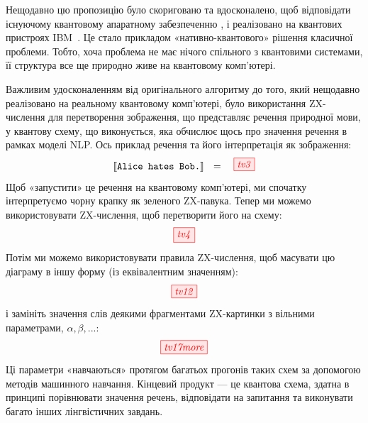 \documentclass[11pt]{article}
\theoremstyle{definition}
\begin{document}
{%



Нещодавно цю пропозицію було скориговано та вдосконалено, щоб відповідати існуючому квантовому апаратному забезпеченню \cite{QPL-QNLP, QNLP-foundations}, і реалізовано на квантових пристроях IBM~\cite{Nature}. Це стало прикладом «нативно-квантового» рішення класичної проблеми. Тобто, хоча проблема не має нічого спільного з квантовими системами, її структура все ще природно живе на квантовому комп’ютері.


Важливим удосконаленням від оригінального алгоритму до того, який нещодавно реалізовано на реальному квантовому комп’ютері, було використання ZX-числення для перетворення зображення, що представляє речення природної мови, у квантову схему, що виконується, яка обчислює щось про значення речення в рамках моделі NLP. Ось приклад речення та його інтерпретація як зображення:
\[
\llbracket \textrm{{\tt Alice hates Bob.}} \rrbracket \ \ =\ \ \ 
\tikzfig{tv3}  
\]
Щоб «запустити» це речення на квантовому комп’ютері, ми спочатку інтерпретуємо чорну крапку як зеленого ZX-павука. Тепер ми можемо використовувати ZX-числення, щоб перетворити його на схему:
\[
\tikzfig{tv4}
\]
Потім ми можемо використовувати правила ZX-числення, щоб масувати цю діаграму в іншу форму (із еквівалентним значенням):
\begin{equation}\label{eq:elastic}
\tikzfig{tv12}
\end{equation}
і замініть значення слів деякими фрагментами ZX-картинки з вільними параметрами, $\alpha, \beta, ...$:
\[
\tikzfig{tv17more}
\]
Ці параметри «навчаються» протягом багатьох прогонів таких схем за допомогою методів машинного навчання. Кінцевий продукт — це квантова схема, здатна в принципі порівнювати значення речень, відповідати на запитання та виконувати багато інших лінгвістичних завдань.

}
\end{document}
